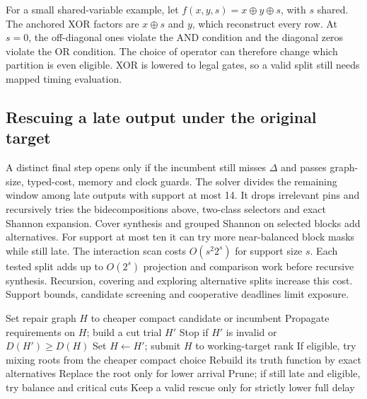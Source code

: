 \documentclass[journal,10pt]{IEEEtran}
\begin{document}
For a small shared-variable example, let \(f(x,y,s)=x\oplus y\oplus s\), with \(s\) shared. The anchored XOR factors are \(x\oplus s\) and \(y\), which reconstruct every row. At \(s=0\), the off-diagonal ones violate the AND condition and the diagonal zeros violate the OR condition. The choice of operator can therefore change which partition is even eligible. XOR is lowered to legal gates, so a valid split still needs mapped timing evaluation.

\subsection{Rescuing a late output under the original target}
A distinct final step opens only if the incumbent still misses \(\Delta\) and passes graph-size, typed-cost, memory and clock guards. The solver divides the remaining window among late outputs with support at most 14. It drops irrelevant pins and recursively tries the bidecompositions above, two-class selectors and exact Shannon expansion. Cover synthesis and grouped Shannon on selected blocks add alternatives. For support at most ten it can try more near-balanced block masks while still late. The interaction scan costs \(O(s^2 2^s)\) for support size \(s\). Each tested split adds up to \(O(2^s)\) projection and comparison work before recursive synthesis. Recursion, covering and exploring alternative splits increase this cost. Support bounds, candidate screening and cooperative deadlines limit exposure.

\begin{algorithm}[!t]
\caption{Timing repair and stated-target rescue}
\label{alg:repair}
\footnotesize
\begin{algorithmic}[1]
  \State Set repair graph \(H\) to cheaper compact candidate or incumbent
    \State Propagate requirements on \(H\); build a cut trial \(H'\)
    \State Stop if \(H'\) is invalid or \(D(H')\ge D(H)\)
    \State Set \(H\gets H'\); submit \(H\) to working-target rank
  \EndWhile
  \State If eligible, try mixing roots from the cheaper compact choice
\EndIf
{}
    \State Rebuild its truth function by exact alternatives
    \State Replace the root only for lower arrival
  \EndFor
  \State Prune; if still late and eligible, try balance and critical cuts
  \State Keep a valid rescue only for strictly lower full delay
\EndIf
\end{algorithmic}
\end{algorithm}
\end{document}
